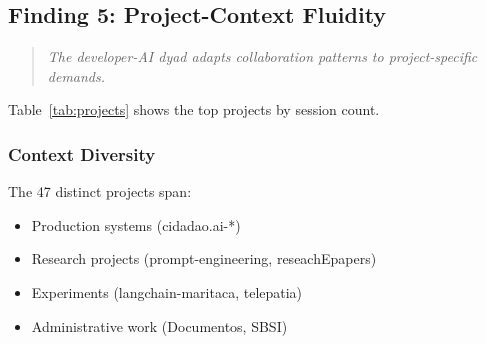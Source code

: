 \subsection{Finding 5: Project-Context Fluidity}

\begin{quote}
\textit{The developer-AI dyad adapts collaboration patterns to project-specific demands.}
\end{quote}

Table~\ref{tab:projects} shows the top projects by session count.

\begin{table}[h]
\caption{Top 10 Projects by Sessions}
\label{tab:projects}
\end{table}

\subsubsection{Context Diversity}

The 47 distinct projects span:
\begin{itemize}
    \item Production systems (cidadao.ai-*)
    \item Research projects (prompt-engineering, reseachEpapers)
    \item Experiments (langchain-maritaca, telepatia)
    \item Administrative work (Documentos, SBSI)
\end{itemize}

